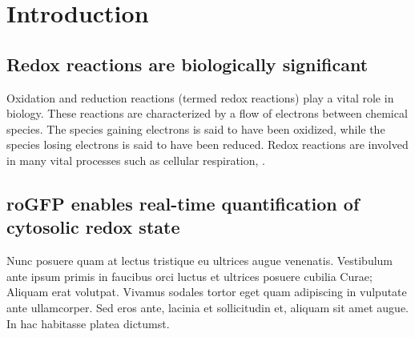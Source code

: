 
\chapter{Introduction} %

\label{Chapter1} %


\section{Redox reactions are biologically significant}
Oxidation and reduction reactions (termed redox reactions) play a vital role in biology. These reactions are characterized by a flow of electrons between chemical species. The species gaining electrons is said to have been oxidized, while the species losing electrons is said to have been reduced. Redox reactions are involved in many vital processes such as cellular respiration, .


\section{roGFP enables real-time quantification of cytosolic redox state}

Nunc posuere quam at lectus tristique eu ultrices augue venenatis. Vestibulum ante ipsum primis in faucibus orci luctus et ultrices posuere cubilia Curae; Aliquam erat volutpat. Vivamus sodales tortor eget quam adipiscing in vulputate ante ullamcorper. Sed eros ante, lacinia et sollicitudin et, aliquam sit amet augue. In hac habitasse platea dictumst.

